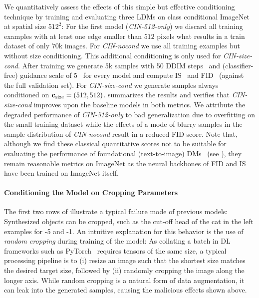 \documentclass{article}
\begin{document}
\sizecondtable
We quantitatively assess the effects of this simple but effective conditioning technique by training and evaluating three LDMs on class conditional ImageNet~\cite{deng2009imagenet} at spatial size $512^2$: For the first model (\emph{CIN-512-only}) we discard all training examples with at least one edge smaller than $512$ pixels what results in a train dataset of only 70k images. For \emph{CIN-nocond} we use all training examples but without size conditioning. This additional conditioning is only used for \emph{CIN-size-cond}. After training we generate 5k samples with 50 DDIM steps~\citep{song2020denoising} and (classifier-free) guidance scale of 5~\citep{ho2022classifier} for every model and compute IS~\cite{salimans2016improved} and FID~\cite{heusel2017gans} (against the full validation set). For \emph{CIN-size-cond} we generate samples always conditioned on $\mathbf{c}_{\text{size}}=(512,512)$.  summarizes the results and verifies that \emph{CIN-size-cond} improves upon the baseline models in both metrics. We attribute the degraded performance of \emph{CIN-512-only} to bad generalization due to overfitting on the small training dataset while the effects of a mode of blurry samples in the sample distribution of \emph{CIN-nocond} result in a reduced FID score. Note that, although we find these classical quantitative scores not to be suitable for evaluating the performance of foundational (text-to-image) DMs~\cite{saharia2022photorealistic,ramesh2022hierarchical,rombach2021high} (see ), they remain reasonable metrics on ImageNet as the neural backbones of FID and IS have been trained on ImageNet itself. 

\paragraph{Conditioning the Model on Cropping Parameters}
\sdoldcomp
The first two rows of  illustrate a typical failure mode of previous \sdshort models: Synthesized objects can be cropped, such as the cut-off head of the cat in the left examples for -5 and -1.
An intuitive explanation for this behavior is the use of \emph{random cropping} during training of the model: As collating a batch in DL frameworks such as PyTorch~\cite{paszke2019pytorch} requires tensors of the same size, a typical processing pipeline is to (i) resize an image such that the shortest size matches the desired target size, followed by (ii) randomly cropping the image along the longer axis. 
%
While random cropping is a natural form of data augmentation, it can leak into the generated samples, causing the malicious effects shown above.
\end{document}
